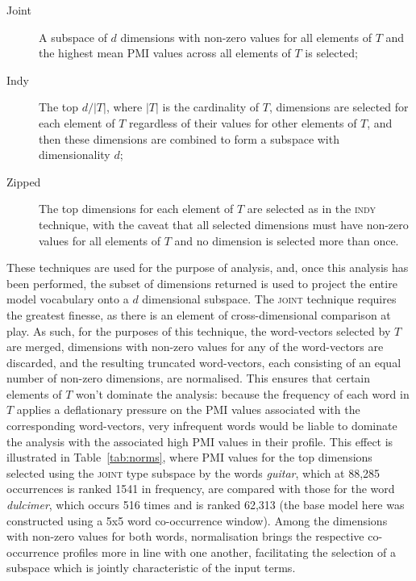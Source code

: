 \begin{description}
\item[Joint] A subspace of $d$ dimensions with non-zero values for all elements of $T$ and the highest mean PMI values across all elements of $T$ is selected;
\item[Indy] The top $d/|T|$, where $|T|$ is the cardinality of $T$, dimensions are selected for each element of $T$ regardless of their values for other elements of $T$, and then these dimensions are combined to form a subspace with dimensionality $d$;
\item[Zipped] The top dimensions for each element of $T$ are selected as in the \textsc{indy} technique, with the caveat that all selected dimensions must have non-zero values for all elements of $T$ and no dimension is selected more than once.
\end{description}

These techniques are used for the purpose of analysis, and, once this analysis has been performed, the subset of dimensions returned is used to project the entire model vocabulary onto a $d$ dimensional subspace.  The \textsc{joint} technique requires the greatest finesse, as there is an element of cross-dimensional comparison at play.  As such, for the purposes of this technique, the word-vectors selected by $T$ are merged, dimensions with non-zero values for any of the word-vectors are discarded, and the resulting truncated word-vectors, each consisting of an equal number of non-zero dimensions, are normalised.  This ensures that certain elements of $T$ won't dominate the analysis: because the frequency of each word in $T$ applies a deflationary pressure on the PMI values associated with the corresponding word-vectors, very infrequent words would be liable to dominate the analysis with the associated high PMI values in their profile.  This effect is illustrated in Table~\ref{tab:norms}, where PMI values for the top dimensions selected using the \textsc{joint} type subspace by the words \emph{guitar}, which at 88,285 occurrences is ranked 1541 in frequency, are compared with those for the word \emph{dulcimer}, which occurs 516 times and is ranked 62,313 (the base model here was constructed using a 5x5 word co-occurrence window).  Among the dimensions with non-zero values for both words, normalisation brings the respective co-occurrence profiles more in line with one another, facilitating the selection of a subspace which is jointly characteristic of the input terms.

